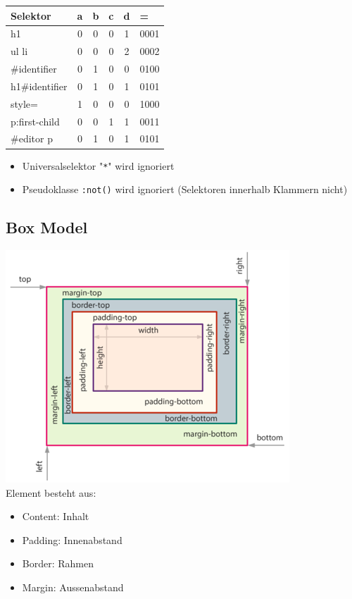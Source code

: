 \documentclass[a4paper, landscape, 8pt]{scrartcl}
\begin{document}
\begin{multicols*}{4}
        \begin{tabular}{|l|c|c|c|c|l|}
            \hline
            Selektor & a & b & c & d & = \\
            \hline
            h1 & 0 & 0 & 0 & 1 & 0001 \\
            \hline
            ul li & 0 & 0 & 0 & 2 & 0002 \\
            \hline
            \#identifier & 0 & 1 & 0 & 0 & 0100 \\
            \hline
            h1\#identifier & 0 & 1 & 0 & 1 & 0101 \\
            \hline
            style=\enquote & 1 & 0 & 0 & 0 & 1000 \\
            \hline
            p:first-child & 0 & 0 & 1 & 1 & 0011 \\
            \hline
            \#editor p & 0 & 1 & 0 & 1 & 0101 \\
            \hline
        \end{tabular}

        \begin{itemize}
            \item Universalselektor "\texttt{*}" wird ignoriert
            \item Pseudoklasse \texttt{:not()} wird ignoriert (Selektoren innerhalb Klammern nicht)
         \end{itemize}

        \subsection{Box Model}
        \includegraphics[scale=0.34]{graphic/03-box-model}
        \\
        Element besteht aus:
        \begin{itemize}
            \item Content: Inhalt
            \item Padding: Innenabstand
            \item Border: Rahmen
            \item Margin: Aussenabstand
        \end{itemize}


\end{multicols*}
\end{document}
